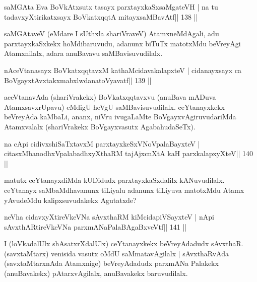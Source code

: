 
\begin{shl}
saMGAta Eva BoVkAtx\s sutx tasayx parxtayxkaSxsaMgateVH |
na tu tadavxyXtirikatxsayx BoVkatxqqtA mitayxsaMBavAtf\hfill || 138 ||
\end{shl}

\begin{artha}
saMGAtaveV (eMdare I sUthxla shariVraveV) AtamxneMdAgali, adu  parxtayxkaSxkekx hoMdibaruvudu, adanunx biTuTx matotxMdu beVreyAgi Atamxnilalx, adara anuBavavu saMBavisuvudilalx.
\end{artha}


\begin{shl}
nAceVtanasayx BoVkatxqqtavxM kathaMcidavakalapxteV |
cidanayxsayx ca BoVgayxtAvxtakxmabxlwdanatoVyavatf\hfill || 139 ||
\end{shl}

\begin{artha}
aceVtanavAda (shariVrakekx) BoVkatxqqtavxvu (anuBava mADuva  AtamxsavxrUpavu) eMdigU heVgU saMBavisuvudilalx.  ceYtanayxkekx beVreyAda kaMbaLi, ananx, niVru ivugaLaMte  BoVgayxvAgiruvudariMda Atamxvalalx (shariVrakekx BoVgayxvasutx AgabahudaSeTx).
\end{artha}

\begin{shl}
na cApi cidivxshiSaTxtavxM parxtayxkeSxVNoVpalaBayxteV |
citasxMbanodhxVpalabadhxyXthaRM tajAjxcnXtA kaH parxkalapxyXteV\hfill || 140 ||
\end{shl}

\begin{artha}
matutx ceYtanayxdiMda kUDidudx parxtayxkaSxdalilx kANuvudilalx. ceYtanayx saMbaMdhavanunx tiLiyalu adanunx tiLiyuva matotxMdu Atamx yAvudeMdu kalipxsuvudakekx Agutatxde? 
\end{artha}

\begin{shl}
neVha cidavxyXtireVkeVNa sAvxthaRM kiMcidapiVSayxteV |
nApi sAvxthARtireVkeVNa parxmANaPalaBAgaBxveVtf\hfill || 141 ||
\end{shl}

\begin{artha}
I (loVkadalUlx shAsatxrXdalUlx) ceYtanayxkekx beVreyAdadudx sAvxthaR.  (savxtaMtarx) venisida vasutx oMdU saMmatavAgilalx | sAvxthaRvAda  (savxtaMtarxnAda Atamxnige) beVreyAdadudx parxmANa Palakekx  (anuBavakekx) pAtarxvAgilalx, anuBavakekx baruvudilalx.
\end{artha}

